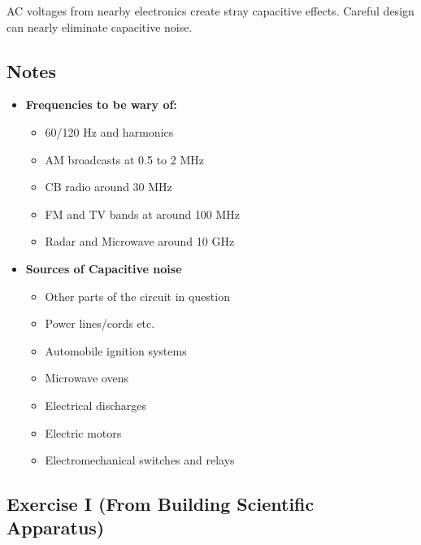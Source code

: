 \documentclass{../lab}
\begin{document}
AC voltages from nearby electronics create stray capacitive effects. Careful design can nearly eliminate capacitive noise.

\subsection{Notes}

\begin{itemize}
    \item \textbf{Frequencies to be wary of:}
    \begin{itemize}
        \item 60/120 Hz and harmonics

        \item AM broadcasts at 0.5 to 2 MHz

        \item CB radio around 30 MHz

        \item FM and TV bands at around 100 MHz

        \item Radar and Microwave around 10 GHz

    \end{itemize}

    \item \textbf{Sources of Capacitive noise}
    \begin{itemize}
        \item Other parts of the circuit in question

        \item Power lines/cords etc.

        \item Automobile ignition systems

        \item Microwave ovens

        \item Electrical discharges

        \item Electric motors

        \item Electromechanical switches and relays

    \end{itemize}

\end{itemize}

\subsection{Exercise I (From Building Scientific Apparatus)}
\end{document}
